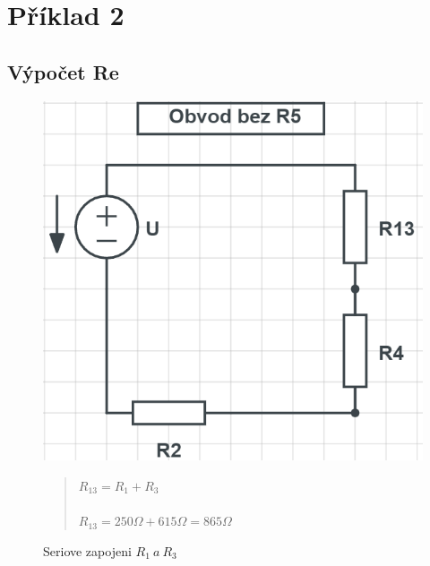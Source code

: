 \section{Příklad 2}
\subsection{Výpočet Re}
\begin{figure}[H]
    \centering
    \includegraphics[scale=0.5]{pic2/u2o1.png}
    \caption{Seriove zapojeni $R_1 \: a \: R_3$}
    \label{fig:Serial_resistor_R13}
    \begin{quote}
    \centering
    $R_{13} = R_1 + R_3$ \\~\\
    $R_{13} = 250\Omega + 615\Omega = 865\Omega$
    \end{quote}
\end{figure}
